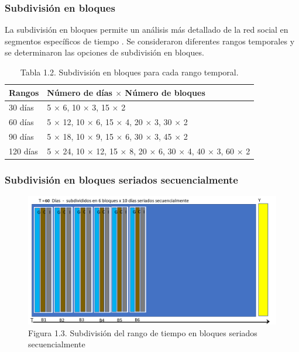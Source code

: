 \documentclass{beamer}
\begin{document}
\begin{frame}
	\frametitle{Subdivisión en bloques}
	La subdivisión en bloques permite un análisis más detallado de la red social en segmentos específicos de tiempo \citep{kim2012a}. Se consideraron diferentes rangos temporales y se determinaron las opciones de subdivisión en bloques. 
	\begin{table}[H]
		\centering
		\begin{tabular}{ll}
			\toprule
			Rangos & Número de días $\times$ Número de bloques \\
			\midrule
			30 días & 5 $\times$ 6, 10 $\times$ 3, 15 $\times$ 2 \\
			60 días & 5 $\times$ 12, 10 $\times$ 6, 15 $\times$ 4, 20 $\times$ 3, 30 $\times$ 2 \\
			90 días & 5 $\times$ 18, 10 $\times$ 9, 15 $\times$ 6, 30 $\times$ 3, 45 $\times$ 2 \\
			120 días & 5 $\times$ 24, 10 $\times$ 12, 15 $\times$ 8, 20 $\times$ 6, 30 $\times$ 4, 40 $\times$ 3, 60 $\times$ 2 \\
			\bottomrule
		\end{tabular}
		\caption{Tabla 1.2. Subdivisión en bloques para cada rango temporal.}
		
		\label{tab:subdivision-bloques1}
	\end{table}

\end{frame}


\begin{frame}
	\frametitle{Subdivisión en bloques seriados secuencialmente}
	\begin{figure}
		\centering
		\includegraphics[width=0.7\linewidth]{figs/imagen20t}
		\caption{Figura 1.3. Subdivisión del rango de tiempo en bloques seriados secuencialmente}
		\label{fig:imagen320}
	\end{figure}
	
\end{frame}
\end{document}
